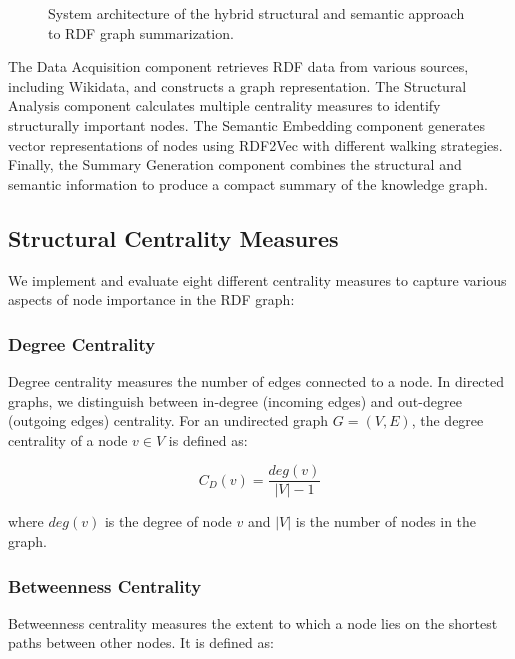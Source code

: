 \documentclass[article,submit,pdftex,moreauthors]{Definitions/mdpi}
\begin{document}
\begin{figure}[H]
    \caption{System architecture of the hybrid structural and semantic approach to RDF graph summarization.}
    \label{fig:architecture}
\end{figure}

The Data Acquisition component retrieves RDF data from various sources, including Wikidata, and constructs a graph representation. The Structural Analysis component calculates multiple centrality measures to identify structurally important nodes. The Semantic Embedding component generates vector representations of nodes using RDF2Vec with different walking strategies. Finally, the Summary Generation component combines the structural and semantic information to produce a compact summary of the knowledge graph.

\subsection{Structural Centrality Measures}
We implement and evaluate eight different centrality measures to capture various aspects of node importance in the RDF graph:

\subsubsection{Degree Centrality}
Degree centrality measures the number of edges connected to a node. In directed graphs, we distinguish between in-degree (incoming edges) and out-degree (outgoing edges) centrality. For an undirected graph $G = (V, E)$, the degree centrality of a node $v \in V$ is defined as:

\begin{equation}
C_D(v) = \frac{deg(v)}{|V| - 1}
\end{equation}

where $deg(v)$ is the degree of node $v$ and $|V|$ is the number of nodes in the graph.

\subsubsection{Betweenness Centrality}
Betweenness centrality measures the extent to which a node lies on the shortest paths between other nodes. It is defined as:
\end{document}
